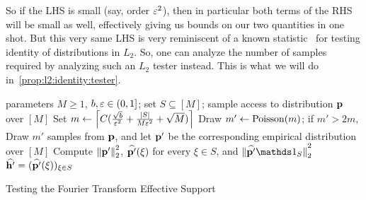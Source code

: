 So if the LHS is small (say, order $\varepsilon^2$), then in particular both terms of the RHS will be small as well, effectively giving us bounds on our two quantities in one shot. But this very same LHS is very reminiscent of a known statistic~\cite{CDVV:14} for testing identity of distributions in $L_2$. So, 
one can analyze the number of samples required by analyzing such an $L_2$ tester instead. 
This is what we will do in~\cref{prop:l2:identity:tester}.

\begin{algorithm}
  \begin{algorithmic}[1]
    \Require parameters $M\geq 1$, $b,\varepsilon\in(0,1]$; set $S\subseteq [M]$; sample access to distribution $\mathbf{p}$ over $[M]$
    \State\label{algo:ft:step:choosemprime} Set $m\gets \left\lceil C(\frac{\sqrt{b}}{\varepsilon^2}+ \frac{\left\lvert S \right\rvert}{M\varepsilon^2}+ \sqrt{M}) \right\rceil$     \State Draw $m'\gets \operatorname{Poisson}\!\left( m \right) $; if $m'>2m$, \Return \reject
    \State\label{algo:ft:step:empr} Draw $m'$ samples from $\mathbf{p}$, and let $\mathbf{p}'$ be the corresponding empirical distribution over $[M]$
    \State\label{algo:ft:step:norm} Compute ${\lVert\mathbf{p}'{\rVert}}_2^2$, $\widehat{\mathbf{p}'}(\xi)$ for every $\xi\in S$, and $\normtwo{\fourier{\q'}\indicSet{S}}^2$ 
    \label{algo:ft:step:norm:check} \Return \reject
     \Return \reject
    \Else
      \State \Return $\widehat{\mathbf{h}'}=(\widehat{\mathbf{p}'}(\xi))_{\xi\in S}$
    \EndIf
  \end{algorithmic}
  \caption{Testing the Fourier Transform Effective Support}\label{algo:ft:effective:support}
\end{algorithm}

